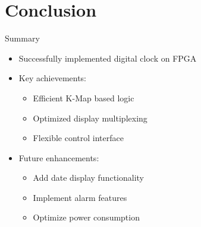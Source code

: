 \documentclass{beamer}
\begin{document}
\section{Conclusion}
\begin{frame}{Summary}
    \begin{itemize}
        \item Successfully implemented digital clock on FPGA
        \item Key achievements:
        \begin{itemize}
            \item Efficient K-Map based logic
            \item Optimized display multiplexing
            \item Flexible control interface
        \end{itemize}
        \item Future enhancements:
        \begin{itemize}
            \item Add date display functionality
            \item Implement alarm features
            \item Optimize power consumption
        \end{itemize}
    \end{itemize}
\end{frame}
\end{document}
